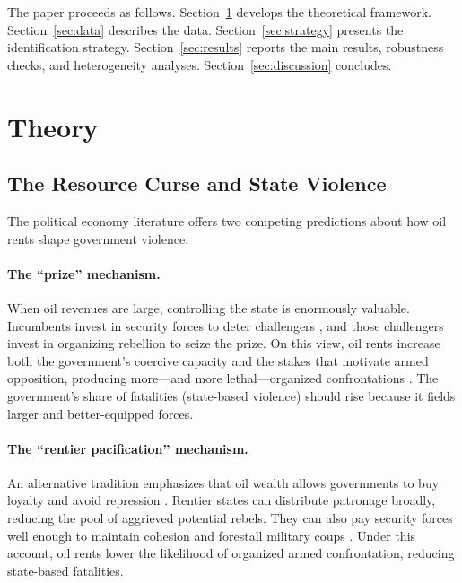 \documentclass[12pt]{article}
\begin{document}
The paper proceeds as follows.
Section~\ref{sec:theory} develops the theoretical framework.
Section~\ref{sec:data} describes the data.
Section~\ref{sec:strategy} presents the identification strategy.
Section~\ref{sec:results} reports the main results, robustness checks,
and heterogeneity analyses.
Section~\ref{sec:discussion} concludes.

\section{Theory}
\label{sec:theory}

\subsection{The Resource Curse and State Violence}

The political economy literature offers two competing predictions
about how oil rents shape government violence.

\paragraph{The ``prize'' mechanism.}
When oil revenues are large, controlling the state is enormously valuable.
Incumbents invest in security forces to deter challengers \citep{bueno2003logic},
and those challengers invest in organizing rebellion to seize the prize.
On this view, oil rents increase both the government's coercive capacity and
the stakes that motivate armed opposition,
producing more---and more lethal---organized confrontations
\citep{collier2004greed,ross2012oil}.
The government's share of fatalities (state-based violence) should rise
because it fields larger and better-equipped forces.

\paragraph{The ``rentier pacification'' mechanism.}
An alternative tradition emphasizes that oil wealth allows governments
to buy loyalty and avoid repression \citep{ross2001does}.
Rentier states can distribute patronage broadly, reducing the pool of
aggrieved potential rebels.
They can also pay security forces well enough to maintain cohesion and
forestall military coups \citep{fjelde2010mineral}.
Under this account, oil rents lower the likelihood of organized armed
confrontation, reducing state-based fatalities.
\end{document}
